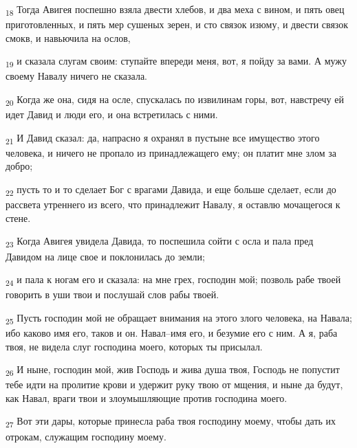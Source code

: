 \begin{tcolorbox}
\textsubscript{18} Тогда Авигея поспешно взяла двести хлебов, и два меха с вином, и пять овец приготовленных, и пять мер сушеных зерен, и сто связок изюму, и двести связок смокв, и навьючила на ослов,
\end{tcolorbox}
\begin{tcolorbox}
\textsubscript{19} и сказала слугам своим: ступайте впереди меня, вот, я пойду за вами. А мужу своему Навалу ничего не сказала.
\end{tcolorbox}
\begin{tcolorbox}
\textsubscript{20} Когда же она, сидя на осле, спускалась по извилинам горы, вот, навстречу ей идет Давид и люди его, и она встретилась с ними.
\end{tcolorbox}
\begin{tcolorbox}
\textsubscript{21} И Давид сказал: да, напрасно я охранял в пустыне все имущество этого человека, и ничего не пропало из принадлежащего ему; он платит мне злом за добро;
\end{tcolorbox}
\begin{tcolorbox}
\textsubscript{22} пусть то и то сделает Бог с врагами Давида, и еще больше сделает, если до рассвета утреннего из всего, что принадлежит Навалу, я оставлю мочащегося к стене.
\end{tcolorbox}
\begin{tcolorbox}
\textsubscript{23} Когда Авигея увидела Давида, то поспешила сойти с осла и пала пред Давидом на лице свое и поклонилась до земли;
\end{tcolorbox}
\begin{tcolorbox}
\textsubscript{24} и пала к ногам его и сказала: на мне грех, господин мой; позволь рабе твоей говорить в уши твои и послушай слов рабы твоей.
\end{tcolorbox}
\begin{tcolorbox}
\textsubscript{25} Пусть господин мой не обращает внимания на этого злого человека, на Навала; ибо каково имя его, таков и он. Навал--имя его, и безумие его с ним. А я, раба твоя, не видела слуг господина моего, которых ты присылал.
\end{tcolorbox}
\begin{tcolorbox}
\textsubscript{26} И ныне, господин мой, жив Господь и жива душа твоя, Господь не попустит тебе идти на пролитие крови и удержит руку твою от мщения, и ныне да будут, как Навал, враги твои и злоумышляющие против господина моего.
\end{tcolorbox}
\begin{tcolorbox}
\textsubscript{27} Вот эти дары, которые принесла раба твоя господину моему, чтобы дать их отрокам, служащим господину моему.
\end{tcolorbox}
